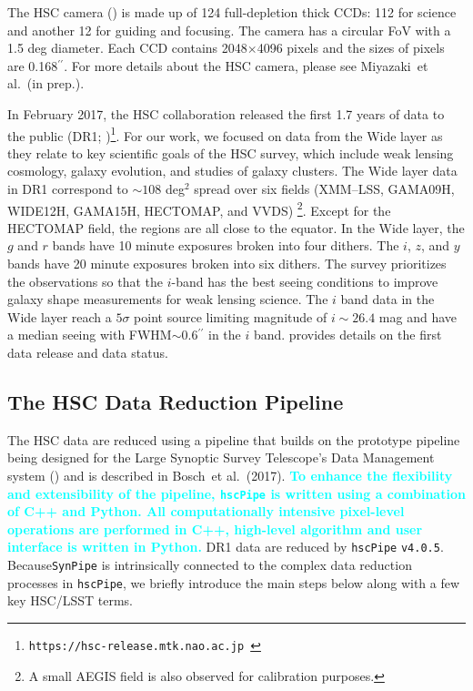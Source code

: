 \documentclass[useamsfonts]{pasj01}
\def\asec{$^{\prime\prime}$}
\def\etal{{\ et al.~}}
\def\hscpipe{\texttt{hscPipe}}
\def\synpipe{\texttt{SynPipe}}
\newcommand{\song}[1]{\textcolor{cyan} {\textbf{#1}}}
\begin{document}
    The HSC camera (\citealt{Miyazaki2012}) is made up of 124 full-depletion thick
    CCDs: 112 for science and another 12 for guiding and focusing.
    The camera has a circular FoV with a 1.5 deg diameter.
    Each CCD contains 2048$\times$4096 pixels and the sizes of pixels are 
    0.168\asec{}.
    For more details about the HSC camera, please see Miyazaki\etal (in prep.).

    In February 2017, the HSC collaboration released the first 1.7 years of data to
    the public (DR1;
    \citealt{HSCDR1})\footnote{\texttt{https://hsc-release.mtk.nao.ac.jp }}.
    For our work, we focused on data from the Wide layer as they relate to key
    scientific goals of the HSC survey, which include weak lensing cosmology, galaxy 
    evolution, and studies of galaxy clusters. 
    The Wide layer data in DR1 correspond to ${\sim}108$ deg$^2$ spread over 
    six fields (XMM--LSS, GAMA09H, WIDE12H, GAMA15H, HECTOMAP, and VVDS)
    \footnote{A small AEGIS field is also observed for calibration purposes.}.
    Except for the HECTOMAP field, the regions are all close to the equator.
    In the Wide layer, the $g$ and $r$ bands have 10 minute exposures broken into 
    four dithers.  
    The $i$, $z$, and $y$ bands have 20 minute exposures broken into six dithers. 
    The survey prioritizes the observations so that the $i$-band has the best seeing 
    conditions to improve galaxy shape measurements for weak lensing science. 
    The $i$ band data in the Wide layer reach a $5\sigma$ point source limiting 
    magnitude of $i{\sim} 26.4$ mag and have a median seeing with 
    FWHM${\sim}0.6$\asec{} in the $i$ band. 
    \citealt{HSCDR1} provides details on the first data release and data status.


\subsection{The HSC Data Reduction Pipeline}
    \label{ssec:hscpipe}

    The HSC data are reduced using a pipeline that builds on the prototype pipeline 
    being designed for the Large Synoptic Survey Telescope’s Data Management system
    (\citealt{Ivezic2008, Axelrod2010, Juric2015}) and is described in 
    Bosch\etal (2017). 
    \song{To enhance the flexibility and extensibility of the pipeline, \hscpipe{} 
    is written using a combination of C++ and Python. 
    All computationally intensive pixel-level operations are performed in C++, 
    high-level algorithm and user interface is written in Python.}
    DR1 data are reduced by \hscpipe{} \texttt{v4.0.5}. 
    Because\synpipe{} is intrinsically connected to the complex data reduction
    processes in \hscpipe{}, we briefly introduce the main steps below along with a 
    few key HSC/LSST terms.
\end{document}
